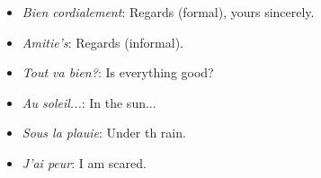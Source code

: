 \begin{itemize}
\item{\emph{Bien cordialement}: Regards (formal), yours sincerely.}

\item{\emph{Amitie's}: Regards (informal).}

\item{\emph{Tout va bien?}: Is everything good?}

\item{\emph{Au soleil...}: In the sun...}

\item{\emph{Sous la plauie}: Under th rain.}

\item{\emph{J'ai peur}: I am scared.}

\end{itemize}
